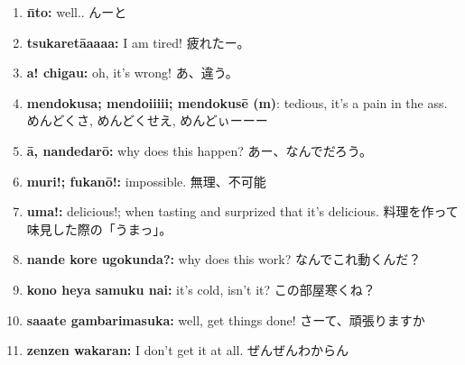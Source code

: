 \documentclass[uplatex,dvipdfmx,b5paper,english,10pt]{jsbook}
\begin{document}
\begin{enumerate}
 \item \ifEnglish
       {\bfseries \=nto:} well..
       \else
       んーと
       \fi
 \item \ifEnglish
       {\bfseries tsukaret\=aaaaa:} I am tired!
       \else
       疲れたー。
       \fi
 \item \ifEnglish
       {\bfseries a! chigau:} oh, it's wrong!
       \else
       あ、違う。
       \fi
 \item \ifEnglish
       {\bfseries mendokusa; mendoiiiii; mendokus\=e (m)}: tedious, it's a pain in the ass.
       \else
       めんどくさ, めんどくせえ, めんどぃーーー
       \fi
 \item \ifEnglish
       {\bfseries \=a, nandedar\=o:} why does this happen?
       \else
       あー、なんでだろう。
       \fi
 \item \ifEnglish
       {\bfseries muri!; fukan\=o!:} impossible.
       \else
       無理、不可能
       \fi
 \item \ifEnglish
       {\bfseries uma!:} delicious!; when tasting and surprized that it's delicious.
       \else
       料理を作って味見した際の「うまっ」。
       \fi
 \item \ifEnglish
       {\bfseries nande kore ugokunda?:} why does this work?
       \else
       なんでこれ動くんだ？
       \fi
 \item \ifEnglish
       {\bfseries kono heya samuku nai:} it's cold, isn't it?
       \else
       この部屋寒くね？
       \fi
 \item \ifEnglish
       {\bfseries saaate gambarimasuka: } well, get things done!
      \else
      さーて、頑張りますか
      \fi
 \item \ifEnglish
       {\bfseries zenzen wakaran:} I don't get it at all.
       \else
       ぜんぜんわからん
       \fi

\end{enumerate}
\end{document}
